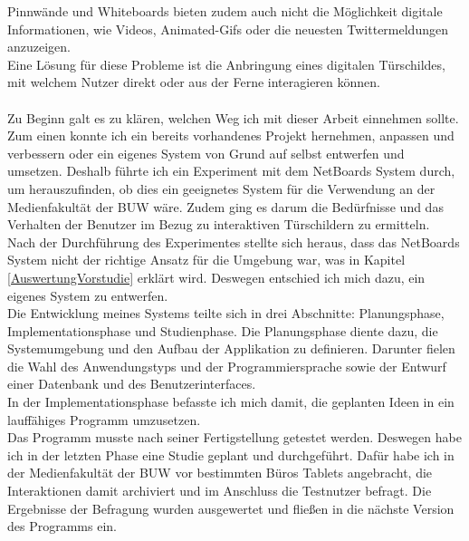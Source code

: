 Pinnwände und Whiteboards bieten zudem auch nicht die Möglichkeit digitale Informationen, wie Videos, Animated-Gifs oder die neuesten Twittermeldungen anzuzeigen.
\\
Eine Lösung für diese Probleme ist die Anbringung eines digitalen Türschildes, mit welchem Nutzer direkt oder aus der Ferne interagieren können.
\\
\\
Zu Beginn galt es zu klären, welchen Weg ich mit dieser Arbeit einnehmen sollte. Zum einen konnte ich ein bereits vorhandenes Projekt hernehmen, anpassen und verbessern oder ein eigenes System von Grund auf selbst entwerfen und umsetzen.
Deshalb führte ich ein Experiment mit dem NetBoards System\cite{wood:2014,netboards:website} durch, um herauszufinden, ob dies ein geeignetes System für die Verwendung an der Medienfakultät der BUW wäre. Zudem ging es darum die Bedürfnisse und das Verhalten der Benutzer im Bezug zu interaktiven Türschildern zu ermitteln.
\\
Nach der Durchführung des Experimentes stellte sich heraus, dass das NetBoards System nicht der richtige Ansatz für die Umgebung war, was in Kapitel \ref{AuswertungVorstudie} erklärt wird. Deswegen entschied ich mich dazu, ein eigenes System zu entwerfen.
\\
Die Entwicklung meines Systems teilte sich in drei Abschnitte: Planungsphase, Implementationsphase und Studienphase.
Die Planungsphase diente dazu, die Systemumgebung und den Aufbau der Applikation zu definieren.
Darunter fielen die Wahl des Anwendungstyps und der Programmiersprache sowie der Entwurf einer Datenbank und des Benutzerinterfaces.
\\
In der Implementationsphase befasste ich mich damit, die geplanten Ideen in ein lauffähiges Programm umzusetzen.
\\
Das Programm musste nach seiner Fertigstellung getestet werden. Deswegen habe ich in der letzten Phase eine Studie geplant und durchgeführt. Dafür habe ich in der Medienfakultät der BUW vor bestimmten Büros Tablets angebracht, die Interaktionen damit archiviert und im Anschluss die Testnutzer befragt. Die Ergebnisse der Befragung wurden ausgewertet und fließen in die nächste Version des Programms ein.